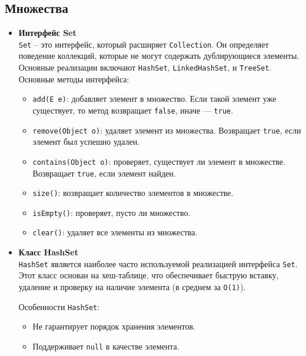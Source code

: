 \subsection{Множества}
\begin{itemize}
    \item \textbf{Интерфейс Set} \\
    \texttt{Set} – это интерфейс, который расширяет \texttt{Collection}. Он определяет поведение коллекций, которые не могут содержать дублирующиеся элементы. Основные реализации включают \texttt{HashSet}, \texttt{LinkedHashSet}, и \texttt{TreeSet}. Основные методы интерфейса: 

    \begin{itemize}
        \item \texttt{add(E e)}: добавляет элемент в множество. Если такой элемент уже существует, то метод возвращает \texttt{false}, иначе — \texttt{true}.
        
        \item \texttt{remove(Object o)}: удаляет элемент из множества. Возвращает \texttt{true}, если элемент был успешно удален.

        \item \texttt{contains(Object o)}: проверяет, существует ли элемент в множестве. Возвращает \texttt{true}, если элемент найден.

        \item \texttt{size()}: возвращает количество элементов в множестве.

        \item \texttt{isEmpty()}: проверяет, пусто ли множество.

        \item \texttt{clear()}: удаляет все элементы из множества.
    \end{itemize}

    \item \textbf{Класс HashSet} \\
    \texttt{HashSet} является наиболее часто используемой реализацией интерфейса \texttt{Set}. Этот класс основан на хеш-таблице, что обеспечивает быструю вставку, удаление и проверку на наличие элемента (в среднем за \texttt{O(1)}).

    Особенности \texttt{HashSet}:
    \begin{itemize}
        \item Не гарантирует порядок хранения элементов.
        \item Поддерживает \texttt{null} в качестве элемента.
    \end{itemize}


\end{itemize}
